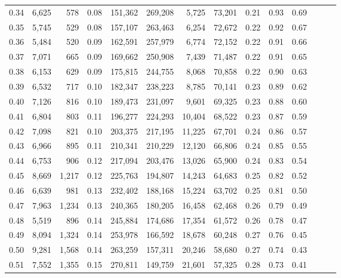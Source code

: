 \begin{tabular}{rrrrrrrrrrrrrr}
0.34 &   6,625 &    578 &  0.08 &  151,362 &  269,208 &   5,725 &  73,201 &  0.21 &  0.93 &      0.69 \\
0.35 &   5,745 &    529 &  0.08 &  157,107 &  263,463 &   6,254 &  72,672 &  0.22 &  0.92 &      0.67 \\
0.36 &   5,484 &    520 &  0.09 &  162,591 &  257,979 &   6,774 &  72,152 &  0.22 &  0.91 &      0.66 \\
0.37 &   7,071 &    665 &  0.09 &  169,662 &  250,908 &   7,439 &  71,487 &  0.22 &  0.91 &      0.65 \\
0.38 &   6,153 &    629 &  0.09 &  175,815 &  244,755 &   8,068 &  70,858 &  0.22 &  0.90 &      0.63 \\
0.39 &   6,532 &    717 &  0.10 &  182,347 &  238,223 &   8,785 &  70,141 &  0.23 &  0.89 &      0.62 \\
0.40 &   7,126 &    816 &  0.10 &  189,473 &  231,097 &   9,601 &  69,325 &  0.23 &  0.88 &      0.60 \\
0.41 &   6,804 &    803 &  0.11 &  196,277 &  224,293 &  10,404 &  68,522 &  0.23 &  0.87 &      0.59 \\
0.42 &   7,098 &    821 &  0.10 &  203,375 &  217,195 &  11,225 &  67,701 &  0.24 &  0.86 &      0.57 \\
0.43 &   6,966 &    895 &  0.11 &  210,341 &  210,229 &  12,120 &  66,806 &  0.24 &  0.85 &      0.55 \\
0.44 &   6,753 &    906 &  0.12 &  217,094 &  203,476 &  13,026 &  65,900 &  0.24 &  0.83 &      0.54 \\
0.45 &   8,669 &  1,217 &  0.12 &  225,763 &  194,807 &  14,243 &  64,683 &  0.25 &  0.82 &      0.52 \\
0.46 &   6,639 &    981 &  0.13 &  232,402 &  188,168 &  15,224 &  63,702 &  0.25 &  0.81 &      0.50 \\
0.47 &   7,963 &  1,234 &  0.13 &  240,365 &  180,205 &  16,458 &  62,468 &  0.26 &  0.79 &      0.49 \\
0.48 &   5,519 &    896 &  0.14 &  245,884 &  174,686 &  17,354 &  61,572 &  0.26 &  0.78 &      0.47 \\
0.49 &   8,094 &  1,324 &  0.14 &  253,978 &  166,592 &  18,678 &  60,248 &  0.27 &  0.76 &      0.45 \\
0.50 &   9,281 &  1,568 &  0.14 &  263,259 &  157,311 &  20,246 &  58,680 &  0.27 &  0.74 &      0.43 \\
0.51 &   7,552 &  1,355 &  0.15 &  270,811 &  149,759 &  21,601 &  57,325 &  0.28 &  0.73 &      0.41 \\

\end{tabular}
